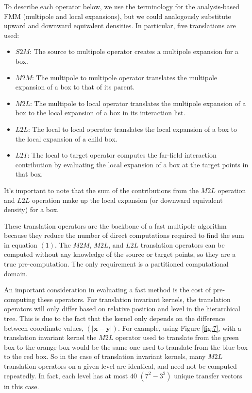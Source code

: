 \documentclass[11pt, oneside]{article}   	%
\begin{document}
To describe each operator below, we use the terminology for the analysis-based FMM (multipole and local expansions), but we could analogously substitute upward and downward equivalent densities. In particular, five translations are used:

\begin{itemize}
\item $S2M$: The source to multipole operator creates a multipole expansion for a box.

\item $M2M$: The multipole to multipole operator translates the multipole expansion of a box to that of its parent.

\item $M2L$: The multipole to local operator translates the multipole expansion of a box to the local expansion of a box in its interaction list.

\item $L2L$: The local to local operator translates the local expansion of a box to the local expansion of a child box.

\item $L2T$: The local to target operator computes the far-field interaction contribution by evaluating the local expansion of a box at the target points in that box.
\end{itemize}

It's important to note that the sum of the contributions from the $M2L$ operation and $L2L$ operation make up the local expansion (or downward equivalent density) for a box.

These translation operators are the backbone of a fast multipole algorithm because they reduce the number of direct computations required to find the sum in equation $(1)$. The $M2M$, $M2L$, and $L2L$ translation operators can be computed without any knowledge of the source or target points, so they are a true pre-computation. The only requirement is a partitioned computational domain.

An important consideration in evaluating a fast method is the cost of pre-computing these operators. For translation invariant kernels, the translation operators will only differ based on relative position and level in the hierarchical tree. This is due to the fact that the kernel only depends on the difference between coordinate values, $(|\mathbf{x}-\mathbf{y}|)$. For example, using Figure \ref{fig:7}, with a translation invariant kernel the $M2L$ operator used to translate from the green box to the orange box would be the same one used to translate from the blue box to the red box. So in the case of translation invariant kernels, many $M2L$ translation operators on a given level are identical, and need not be computed repeatedly. In fact, each level has at most $40$ $(7^2-3^2)$ unique transfer vectors in this case.
\end{document}
